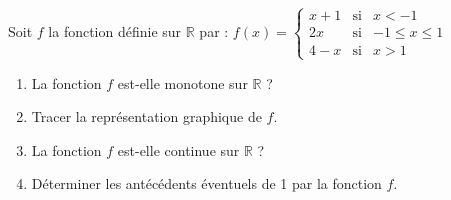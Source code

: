 
\begin{exercice}\label{exostarterST-0002}

Soit $f$ la fonction définie sur $\mathbb{R}$ par : $f(x) = \left\{\begin{array}{ccc}x+1&\text{si}&x<-1\\2x&\text{si}&-1\leqslant x\leqslant 1\\4-x&\text{si}&x>1\end{array}\right.$

\begin{enumerate}
\item La fonction $f$ est-elle monotone sur  $\mathbb{R}$ ?
\item Tracer la représentation graphique de $f$.
\item La fonction $f$ est-elle continue sur  $\mathbb{R}$ ?
\item Déterminer les antécédents éventuels de 1 par la fonction $f$. 
\end{enumerate}


\end{exercice}
